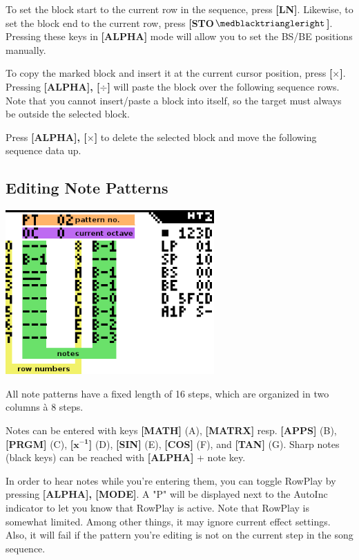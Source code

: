 \documentclass[12pt]{report}	%
\begin{document}
To set the block start to the current row in the sequence, press \textbf{[LN]}. Likewise, to set the block end to the current row, press \textbf{[STO\(\medblacktriangleright\)]}. Pressing these keys in \textbf{[ALPHA]} mode will allow you to set the BS/BE positions manually.

To copy the marked block and insert it at the current cursor position, press \textbf{[\(\bm{\times}\)]}. Pressing \textbf{[ALPHA], [\(\bm{\div}\)]} will paste the block over the following sequence rows. Note that you cannot insert/paste a block into itself, so the target must always be outside the selected block.

Press \textbf{[ALPHA], [\(\bm{\times}\)]} to delete the selected block and move the following sequence data up.


\subsection{Editing Note Patterns}
\label{sec:notepat}

{\includegraphics[width=0.6\textwidth]{noteptns}} \newline

All note patterns have a fixed length of 16 steps, which are organized in two columns à 8 steps.

Notes can be entered with keys \textbf{[MATH]} (A), \textbf{[MATRX]} resp. \textbf{[APPS]} (B), \textbf{[PRGM]} (C), \textbf{[$\bm{x^{-1}}$]} (D), \textbf{[SIN]} (E), \textbf{[COS]} (F), and \textbf{[TAN]} (G). Sharp notes (black keys) can be reached with \textbf{[ALPHA]} + note key.

In order to hear notes while you're entering them, you can toggle RowPlay by pressing \textbf{[ALPHA], [MODE]}. A "P" will be displayed next to the AutoInc indicator to let you know that RowPlay is active. Note that RowPlay is somewhat limited. Among other things, it may ignore current effect settings. Also, it will fail if the pattern you're editing is not on the current step in the song sequence.
\end{document}

